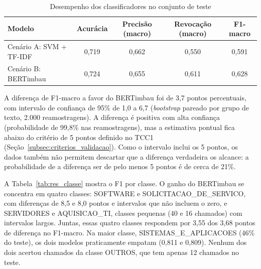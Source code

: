 \documentclass[
    12pt,                %
    openright,           %
    oneside,             %
    a4paper,             %
    english,             %
    brazil               %
]{abntex2}
\let\legendoriginal\legend
\renewcommand{\legend}[1]{\legendoriginal{\small #1}}
\begin{document}
\begin{table}[htb]
  \centering
  \caption{Desempenho dos classificadores no conjunto de teste}
  \label{tab:res_teste}
  \small
  \setlength{\tabcolsep}{4pt}
  \begin{tabular}{lcccc}
    \toprule
    Modelo & Acurácia & Precisão (macro) & Revocação (macro) & F1-macro \\
    \midrule
    Cenário A: SVM + TF-IDF & 0,719 & 0,662 & 0,550 & 0,591 \\
    Cenário B: BERTimbau & 0,724 & 0,655 & 0,611 & 0,628 \\
    \bottomrule
  \end{tabular}
  \legend{Fonte: Elaborado pelos autores}
\end{table}

A diferença de F1-macro a favor do BERTimbau foi de 3,7 pontos percentuais, com intervalo de confiança de 95\% de 1,0 a 6,7 (\textit{bootstrap} pareado por grupo de texto, 2.000 reamostragens). A diferença é positiva com alta confiança (probabilidade de 99,8\% nas reamostragens), mas a estimativa pontual fica abaixo do critério de 5 pontos definido no TCC1 (Seção~\ref{subsec:criterios_validacao}). Como o intervalo inclui os 5 pontos, os dados também não permitem descartar que a diferença verdadeira os alcance: a probabilidade de a diferença ser de pelo menos 5 pontos é de cerca de 21\%.

A Tabela~\ref{tab:res_classe} mostra o F1 por classe. O ganho do BERTimbau se concentra em quatro classes: SOFTWARE e SOLICITACAO\_DE\_SERVICO, com diferenças de 8,5 e 8,0 pontos e intervalos que não incluem o zero, e SERVIDORES e AQUISICAO\_TI, classes pequenas (40 e 16 chamados) com intervalos largos. Juntas, essas quatro classes respondem por 3,55 dos 3,68 pontos de diferença no F1-macro. Na maior classe, SISTEMAS\_E\_APLICACOES (46\% do teste), os dois modelos praticamente empatam (0,811 e 0,809). Nenhum dos dois acertou chamados da classe OUTROS, que tem apenas 12 chamados no teste.
\end{document}
